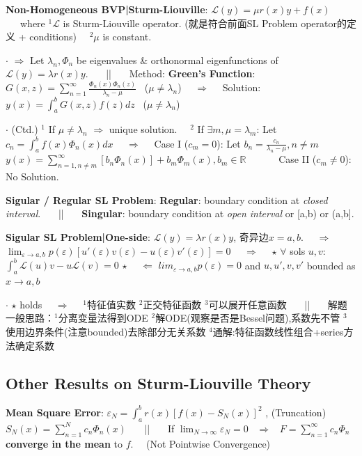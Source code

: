 \documentclass[8pt]{extarticle}
\begin{document}
\textbf{Non-Homogeneous BVP|Sturm-Liouville}: $\mathcal{L}(y)=\mu r(x)y+f(x)$ \ \ \ where $^1\mathcal{L}$ is Sturm-Liouville operator. ({\tiny 就是符合前面SL Problem operator的定义 + conditions}) \ \ $^2\mu$ is constant.

$\cdot$ $\Rightarrow$ Let $\lambda_n,\Phi_n$ be eigenvalues \& orthonormal eigenfunctions of $\mathcal{L}(y)=\lambda r(x)y$. \ \ \ || \ \ \ Method: \textbf{Green's Function}: $G(x,z)=\sum_{n=1}^{\infty}\frac{\Phi_n(x)\Phi_n(z)}{\lambda_n-\mu}$ \ {\tiny ($\mu\ne\lambda_n$)} \ \ $\Rightarrow$ \ \ Solution: $y(x)=\int^b_aG(x,z)f(z)dz$ \ {\tiny ($\mu\ne\lambda_n$)}

\vspace{-2pt}
$\cdot$ (Ctd.) $^1$ If $\mu\ne\lambda_n$ $\Rightarrow$ unique solution. \ \ $^2$ If $\exists m,\mu=\lambda_m$: Let $c_n=\int^b_af(x)\Phi_n(x)dx$ \ \ $\Rightarrow$ \ \ Case I ($c_m=0$): Let $b_n=\frac{c_n}{\lambda_n-\mu}${\tiny $,n\ne m$} \ \ $y(x)=\sum_{n=1,n\ne m}^\infty [b_n\Phi_n(x)]+b_m\Phi_m(x),b_m\in\mathbb{R}$ \ \ \ \ \ \ Case II ($c_m\ne0$): {\tiny No Solution.}

\textbf{Sigular / Regular SL Problem}: \textbf{Regular}: boundary condition at \textit{closed interval}. \ \ \ || \ \ \ \textbf{Singular}: boundary condition at \textit{open interval} or [a,b) or (a,b].

\textbf{Sigular SL Problem|One-side}: $\mathcal{L}(y)=\lambda r(x)y$, 奇异边$x=a,b$. \ \ $\Rightarrow$ \ \ $\lim_{\varepsilon\to a,b}p(\varepsilon)[u'(\varepsilon)v(\varepsilon)-u(\varepsilon)v'(\varepsilon)]=0$ \ \ $\Rightarrow$ \ \ $\star$ $\forall$ sols $u,v$: $\int_{a}^{b}\mathcal{L}(u)v-u\mathcal{L}(v)=0$ $\star$ \ \ $\Leftarrow$ $lim_{\varepsilon\to a,b}p(\varepsilon)=0$ and $u,u',v,v'$ bounded as $x\to a,b$

{\tiny $\cdot$ $\star$ holds \ \ $\Rightarrow$ \ \ $^1$特征值实数 $^2$正交特征函数 $^3$可以展开任意函数 \ \ \ || \ \ \ 解题一般思路：$^1$分离变量法得到ODE $^2$解ODE(观察是否是Bessel问题),系数先不管 $^3$使用边界条件(注意bounded)去除部分无关系数 $^4$通解:特征函数线性组合+series方法确定系数}


\subsection{Other Results on Sturm-Liouville Theory}

\textbf{Mean Square Error}: $\varepsilon_N=\int_{a}^{b}r(x)[f(x)-S_N(x)]^2$ , (Truncation) $S_N(x)=\sum^N_{n=1}c_n\Phi_n(x)$ \ \ \ || \ \ \ If $\lim_{N\to\infty}\varepsilon_N=0$ \ $\Rightarrow$ \ $F=\sum^\infty_{n=1}c_n\Phi_n$ \textbf{converge in the mean} to $f$. \ \ (Not Pointwise Convergence)
\end{document}
